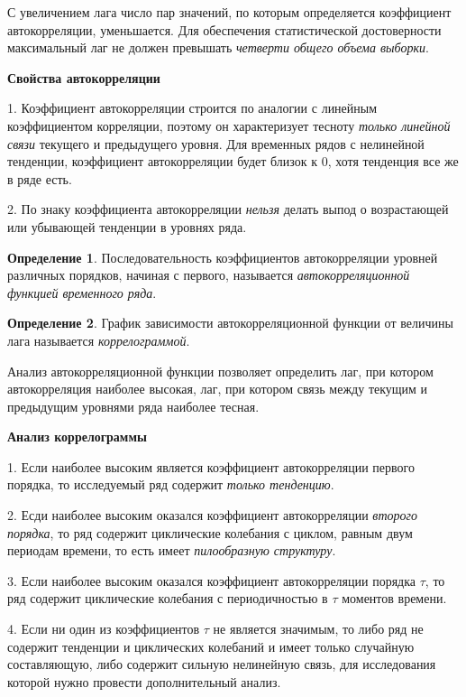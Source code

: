 \documentclass[aps,%
12pt,%
final,%
oneside,
onecolumn,%
musixtex, %
superscriptaddress,%
centertags]{article} %
\theoremstyle{plain}
\theoremstyle{definition}
\newtheorem{definition}{Определение}[subsection]
\theoremstyle{remark}
\begin{document}
С увеличением лага число пар значений, по которым определяется коэффициент автокорреляции, уменьшается. Для обеспечения статистической достоверности максимальный лаг не должен превышать \textit{четверти общего объема выборки}.

\textbf{Свойства автокорреляции}

1. Коэффициент автокорреляции строится по аналогии с линейным коэффициентом корреляции, поэтому он характеризует тесноту \textit{только линейной связи} текущего и предыдущего уровня. Для временных рядов с нелинейной тенденции, коэффициент автокорреляции будет близок к $0$, хотя тенденция все же в ряде есть.

2. По знаку коэффициента автокорреляции \textit{нельзя} делать выпод о возрастающей или убывающей тенденции в уровнях ряда.

\begin{definition}
	Последовательность коэффициентов автокорреляции уровней различных порядков, начиная с первого, называется \textit{автокорреляционной функцией временного ряда}.
\end{definition}

\begin{definition}
	График зависимости автокорреляционной функции от величины лага называется \textit{коррелограммой}.
\end{definition}

Анализ автокорреляционной функции позволяет определить лаг, при котором автокорреляция наиболее высокая, лаг, при котором связь между текущим и предыдущим уровнями ряда наиболее тесная.

\textbf{Анализ коррелограммы}

1. Если наиболее высоким является коэффициент автокорреляции первого порядка, то исследуемый ряд содержит \textit{только тенденцию}.

2. Есди наиболее высоким оказался коэффициент автокорреляции \textit{второго порядка}, то ряд содержит циклические колебания с циклом, равным двум периодам времени, то есть имеет \textit{пилообразную структуру}.

3. Если наиболее высоким оказался коэффициент автокорреляции порядка $\tau$, то ряд содержит циклические колебания с периодичностью в $\tau$ моментов времени.

4. Если ни один из коэффициентов $\tau$ не является значимым, то либо ряд не содержит тенденции и циклических колебаний и имеет только случайную составляющую, либо содержит сильную нелинейную связь, для исследования которой нужно провести дополнительный анализ.
\end{document}
